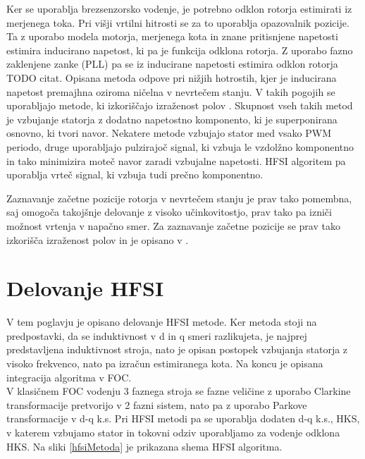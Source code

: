 \documentclass[a4paper,twoside,openright,12pt,slovene]{book}
\begin{document}
Ker se uporablja brezsenzorsko vodenje, je potrebno odklon rotorja estimirati iz merjenega toka. Pri višji vrtilni hitrosti se za to uporablja opazovalnik pozicije. Ta z uporabo modela motorja, merjenega
kota in znane pritisnjene napetosti estimira inducirano napetost, ki pa je funkcija odklona rotorja. Z uporabo fazno zaklenjene zanke (PLL) pa se iz inducirane napetosti estimira odklon rotorja TODO
citat.
Opisana metoda odpove pri nižjih hotrostih, kjer je inducirana napetost premajhna oziroma ničelna v nevrtečem stanju. V takih pogojih se uporabljajo metode, ki izkoriščajo izraženost polov \cite{ThreeYearsOfExperience}. Skupnost
vseh takih metod je vzbujanje statorja z dodatno napetostno komponento, ki je superponirana osnovno, ki tvori navor. Nekatere metode vzbujajo stator med vsako PWM periodo, druge uporabljajo pulzirajoč
signal, ki vzbuja le vzdolžno komponentno in tako minimizira moteč navor zaradi vzbujalne napetosti. HFSI algoritem pa uporablja vrteč signal, ki vzbuja tudi prečno komponentno. 

Zaznavanje začetne pozicije rotorja v nevrtečem stanju je prav tako pomembna, saj omogoča takojšnje delovanje z visoko učinkovitostjo, prav tako pa izniči možnost vrtenja v napačno smer. Za zaznavanje
začetne pozicije se prav tako izkorišča izraženost polov in je opisano v \cite{IPDBoussak}.

\chapter{Delovanje HFSI} \label{teorija}


V tem poglavju je opisano delovanje HFSI metode. Ker metoda stoji na predpostavki, da se induktivnost v d in q smeri razlikujeta, je najprej predstavljena induktivnost stroja, nato je
opisan postopek vzbujanja statorja z visoko frekvenco, nato pa izračun estimiranega kota. Na koncu je opisana integracija algoritma v FOC.
\\
V klasičnem FOC vodenju 3 faznega stroja se fazne veličine z uporabo Clarkine transformacije pretvorijo v 2 fazni sistem, nato pa z uporabo Parkove transformacije v d-q k.s. Pri HFSI metodi pa se
uporablja dodaten d-q k.s., HKS, v katerem vzbujamo stator in tokovni odziv uporabljamo za vodenje odklona HKS. Na sliki \ref{hfsiMetoda} je prikazana shema HFSI algoritma.
\end{document}

